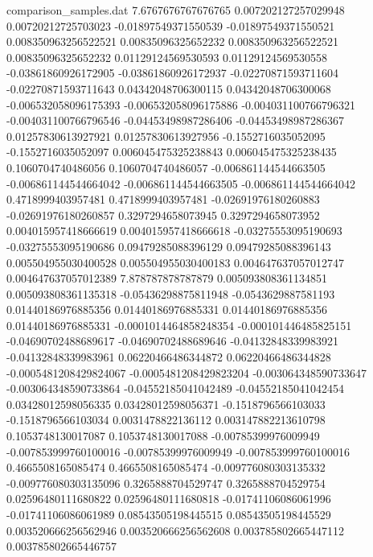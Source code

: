 \begin{filecontents}{comparison_samples.dat}
7.6767676767676765  0.007202127257029948    0.00720212725703023     -0.01897549371550539   -0.01897549371550521   0.008350963256522521   0.00835096325652232    0.008350963256522521   0.00835096325652232    0.01129124569530593    0.01129124569530558    -0.03861860926172905    -0.03861860926172937    -0.02270871593711604   -0.02270871593711643   0.04342048706300115     0.04342048706300068     -0.006532058096175393   -0.006532058096175886   -0.004031100766796321   -0.004031100766796546   -0.04453498987286406    -0.04453498987286367    0.01257830613927921     0.01257830613927956     -0.1552716035052095     -0.1552716035052097     0.006045475325238843   0.006045475325238435   0.1060704740486056     0.1060704740486057     -0.006861144544663505   -0.006861144544664042   -0.006861144544663505   -0.006861144544664042   0.4718999403957481     0.4718999403957481     -0.02691976180260883    -0.02691976180260857    0.3297294658073945     0.3297294658073952     0.004015957418666619    0.004015957418666618    -0.03275553095190693    -0.03275553095190686    0.09479285088396129    0.09479285088396143    0.005504955030400528   0.005504955030400183   0.004647637057012747    0.004647637057012389  
7.878787878787879   0.005093808361134851    0.005093808361135318    -0.05436298875811948   -0.0543629887581193    0.01440186976885356    0.01440186976885331    0.01440186976885356    0.01440186976885331    -0.0001014464858248354 -0.000101446485825151  -0.04690702488689617    -0.04690702488689646    -0.04132848339983921   -0.04132848339983961   0.06220466486344872     0.06220466486344828     -0.0005481208429824067  -0.0005481208429823204  -0.003064348590733647   -0.003064348590733864   -0.04552185041042489    -0.04552185041042454    0.03428012598056335     0.03428012598056371     -0.1518796566103033     -0.1518796566103034     0.0031478822136112     0.003147882213610798   0.1053748130017087     0.1053748130017088     -0.00785399976009949    -0.007853999760100016   -0.00785399976009949    -0.007853999760100016   0.4665508165085474     0.4665508165085474     -0.009776080303135332   -0.009776080303135096   0.3265888704529747     0.3265888704529754     0.02596480111680822     0.02596480111680818     -0.01741106086061996    -0.01741106086061989    0.08543505198445515    0.08543505198445529    0.003520666256562946   0.003520666256562608   0.003785802665447112    0.003785802665446757  

\end{filecontents}
